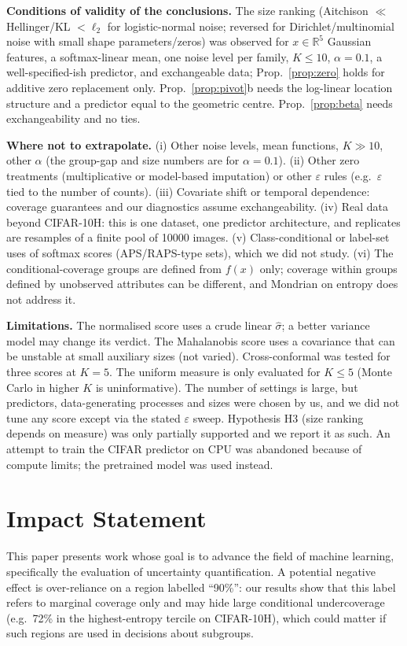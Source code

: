 \documentclass{article}
\theoremstyle{plain}
\theoremstyle{remark}
\newcommand{\R}{\mathbb{R}}
\begin{document}
\textbf{Conditions of validity of the conclusions.} The size ranking (Aitchison $\ll$ Hellinger/KL $<\ell_2$ for logistic-normal noise; reversed for Dirichlet/multinomial noise with small shape parameters/zeros) was observed for $x\in\R^5$ Gaussian features, a softmax-linear mean, one noise level per family, $K\le10$, $\alpha=0.1$, a well-specified-ish predictor, and exchangeable data; Prop.~\ref{prop:zero} holds for additive zero replacement only. Prop.~\ref{prop:pivot}b needs the log-linear location structure and a predictor equal to the geometric centre. Prop.~\ref{prop:beta} needs exchangeability and no ties.

\textbf{Where not to extrapolate.} (i) Other noise levels, mean functions, $K\gg10$, other $\alpha$ (the group-gap and size numbers are for $\alpha=0.1$). (ii) Other zero treatments (multiplicative or model-based imputation) or other $\varepsilon$ rules (e.g.\ $\varepsilon$ tied to the number of counts). (iii) Covariate shift or temporal dependence: coverage guarantees and our diagnostics assume exchangeability. (iv) Real data beyond CIFAR-10H: this is one dataset, one predictor architecture, and replicates are resamples of a finite pool of 10000 images. (v) Class-conditional or label-set uses of softmax scores (APS/RAPS-type sets), which we did not study. (vi) The conditional-coverage groups are defined from $f(x)$ only; coverage within groups defined by unobserved attributes can be different, and Mondrian on entropy does not address it.

\textbf{Limitations.} The normalised score uses a crude linear $\hat\sigma$; a better variance model may change its verdict. The Mahalanobis score uses a covariance that can be unstable at small auxiliary sizes (not varied). Cross-conformal was tested for three scores at $K{=}5$. The uniform measure is only evaluated for $K\le5$ (Monte Carlo in higher $K$ is uninformative). The number of settings is large, but predictors, data-generating processes and sizes were chosen by us, and we did not tune any score except via the stated $\varepsilon$ sweep. Hypothesis H3 (size ranking depends on measure) was only partially supported and we report it as such. An attempt to train the CIFAR predictor on CPU was abandoned because of compute limits; the pretrained model was used instead.

\section*{Impact Statement}
This paper presents work whose goal is to advance the field of machine learning, specifically the evaluation of uncertainty quantification. A potential negative effect is over-reliance on a region labelled ``90\%'': our results show that this label refers to marginal coverage only and may hide large conditional undercoverage (e.g.\ 72\% in the highest-entropy tercile on CIFAR-10H), which could matter if such regions are used in decisions about subgroups.




\newpage
\appendix
\onecolumn

\end{document}
